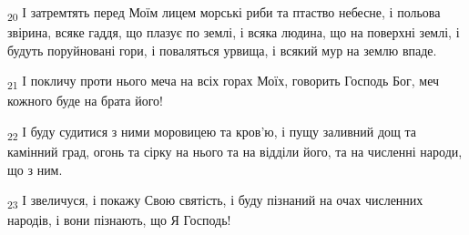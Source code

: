 \begin{tcolorbox}
\textsubscript{20} І затремтять перед Моїм лицем морські риби та птаство небесне, і польова звірина, всяке гаддя, що плазує по землі, і всяка людина, що на поверхні землі, і будуть поруйновані гори, і поваляться урвища, і всякий мур на землю впаде.
\end{tcolorbox}
\begin{tcolorbox}
\textsubscript{21} І покличу проти нього меча на всіх горах Моїх, говорить Господь Бог, меч кожного буде на брата його!
\end{tcolorbox}
\begin{tcolorbox}
\textsubscript{22} І буду судитися з ними моровицею та кров'ю, і пущу заливний дощ та камінний град, огонь та сірку на нього та на відділи його, та на численні народи, що з ним.
\end{tcolorbox}
\begin{tcolorbox}
\textsubscript{23} І звеличуся, і покажу Свою святість, і буду пізнаний на очах численних народів, і вони пізнають, що Я Господь!
\end{tcolorbox}
